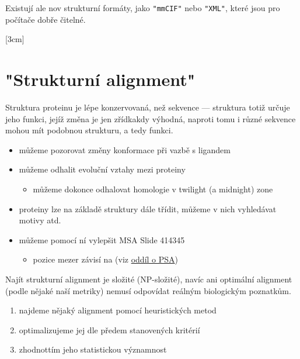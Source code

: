 \documentclass[DIV=8]{scrreprt}
\newcommand{\inlinecode}{\texttt}
\begin{document}
Existují ale nov strukturní formáty, jako \inlinecode{"mmCIF"} nebo \inlinecode{"XML"}, které jsou pro počítače dobře čitelné.

[3cm]

\chapter{"Strukturní alignment"}

Struktura proteinu je lépe konzervovaná, než sekvence --- struktura totiž určuje jeho funkci, jejíž změna je jen zřídkakdy výhodná, naproti tomu i různé sekvence mohou mít podobnou strukturu, a tedy funkci.

\begin{itemize}
    \item můžeme pozorovat změny konformace při vazbě s ligandem
    \item můžeme odhalit evoluční vztahy mezi proteiny
\begin{itemize}
    \item můžeme dokonce odhalovat homologie v twilight (a midnight) zone
\end{itemize}

    \item proteiny lze na základě struktury dále třídit, můžeme v nich vyhledávat motivy atd.
    \item můžeme pomocí ní vylepšit MSA Slide 414345
\begin{itemize}
    \item pozice mezer závisí na (viz \href{#Pairwise sequence alignment}{oddíl o PSA})
\end{itemize}

\end{itemize}


Najít strukturní alignment je složité (NP-složité), navíc ani optimální alignment (podle nějaké naší metriky) nemusí odpovídat reálným biologickým poznatkům.

\begin{enumerate}
    \item najdeme nějaký alignment pomocí heuristických metod
    \item optimalizujeme jej dle předem stanovených kritérií
    \item zhodnottím jeho statistickou významnost
\end{enumerate}
\end{document}
